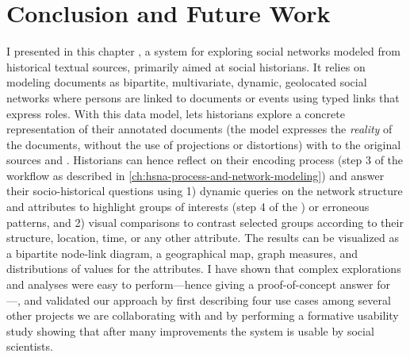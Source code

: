 \section{Conclusion and Future Work}

I presented in this chapter \name, a \va system for exploring social networks modeled from historical textual sources, primarily aimed at social historians.
It relies on modeling documents as bipartite, multivariate, dynamic, geolocated social networks where persons are linked to documents or events using typed links that express roles.
With this data model, \name lets historians explore a concrete representation of their annotated documents (\ie the model expresses the \emph{reality} of the documents, without the use of projections or distortions) with \traceability to the original sources and \simplicity.
Historians can hence reflect on their encoding process (step 3 of the \hsna workflow as described in \autoref{ch:hsna-process-and-network-modeling}) and answer their socio-historical questions using 1) dynamic queries on the network structure and attributes to highlight groups of interests (step 4 of the \hsna) or erroneous patterns, and 2) visual comparisons to contrast selected groups according to their structure, location, time, or any other attribute.
The results can be visualized as a bipartite node-link diagram, a geographical map, graph measures, and distributions of values for the attributes.
I have shown that complex explorations and analyses were easy to perform---hence giving a proof-of-concept answer for \qtwo---, and validated our approach by first describing four use cases among several other projects we are collaborating with and by performing a formative usability study showing that after many improvements the system is usable by social scientists.


